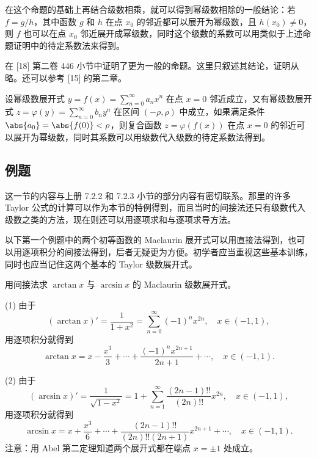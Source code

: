 \begin{xremark}
在这个命题的基础上再结合级数相乘，就可以得到幂级数相除的一般结论：若 $f=g/h$，其中函数 $g$ 和 $h$ 在点 $x_0$ 的邻近都可以展开为幂级数，且 $h(x_0)\ne0$，则 $f$ 也可以在点 $x_0$ 邻近展开成幂级数，同时这个级数的系数可以用类似于上述命题证明中的待定系数法来得到。
\end{xremark}

\begin{xremark}
在 [18] 第二卷 446 小节中证明了更为一般的命题。这里只叙述其结论，证明从略。还可以参考 [15] 的第二章。
\end{xremark}

\begin{xproposition}
设幂级数展开式 $y=f(x)=\displaystyle\sum_{n=0}^{\infty}a_nx^n$ 在点 $x=0$ 邻近成立，又有幂级数展开式 $z=\varphi(y)=\displaystyle\sum_{n=0}^{\infty}b_ny^n$ 在区间 $(-\rho,\rho)$ 中成立，如果满足条件 $\abs{a_0}=\abs{f(0)}<\rho$，则复合函数 $z=\varphi(f(x))$ 在点 $x=0$ 的邻近可以展开为幂级数，同时其系数可以用级数代入级数的待定系数法得到。
\end{xproposition}

\subsection{例题}

这一节的内容与上册 7.2.2 和 7.2.3 小节的部分内容有密切联系。那里的许多 Taylor 公式的计算可以作为本节的特例得到，而且当时的间接法还只有级数代入级数之类的方法，现在则还可以用逐项求和与逐项求导方法。

以下第一个例题中的两个初等函数的 Maclaurin 展开式可以用直接法得到，也可以用逐项积分的间接法得到，后者无疑更为方便。初学者应当重视这些基本训练，同时也应当记住这两个基本的 Taylor 级数展开式。

\begin{xexample}[14.4.1]
用间接法求 $\arctan x$ 与 $\arcsin x$ 的 Maclaurin 级数展开式。
\end{xexample}
\begin{xsolution}
(1) 由于
\[
  (\arctan x)'=\frac1{1+x^2}=\sum_{n=0}^{\infty}(-1)^nx^{2n},\quad x\in(-1,1),
\]
用逐项积分就得到
\[
  \arctan x=x-\frac{x^3}{3}+\cdots+\frac{(-1)^nx^{2n+1}}{2n+1}+\cdots,\quad x\in(-1,1).
\]

(2) 由于
\[
  (\arcsin x)'=\frac1{\sqrt{1-x^2}}=1+\sum_{n=1}^{\infty}\frac{(2n-1)!!}{(2n)!!}x^{2n},\quad x\in(-1,1),
\]
用逐项积分就得到
\[
  \arcsin x=x+\frac{x^3}{6}+\cdots+\frac{(2n-1)!!}{(2n)!!(2n+1)}x^{2n+1}+\cdots,\quad x\in(-1,1).
\]
注意：用 Abel 第二定理知道两个展开式都在端点 $x=\pm1$ 处成立。
\end{xsolution}

